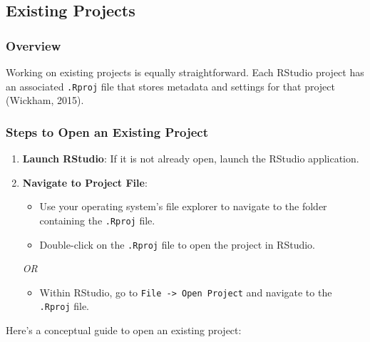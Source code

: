 \documentclass[
]{book}
\providecommand{\tightlist}{%
  \setlength{\itemsep}{0pt}\setlength{\parskip}{0pt}}
\begin{document}
\hypertarget{existing-projects}{%
\subsection*{Existing Projects}\label{existing-projects}}

\hypertarget{overview-9}{%
\subsubsection*{Overview}\label{overview-9}}

Working on existing projects is equally straightforward. Each RStudio project has an associated \texttt{.Rproj} file that stores metadata and settings for that project (Wickham, 2015).

\hypertarget{steps-to-open-an-existing-project}{%
\subsubsection*{Steps to Open an Existing Project}\label{steps-to-open-an-existing-project}}

\begin{enumerate}
\def\labelenumi{\arabic{enumi}.}
\item
  \textbf{Launch RStudio}: If it is not already open, launch the RStudio application.
\item
  \textbf{Navigate to Project File}:

  \begin{itemize}
  \tightlist
  \item
    Use your operating system's file explorer to navigate to the folder containing the \texttt{.Rproj} file.
  \item
    Double-click on the \texttt{.Rproj} file to open the project in RStudio.
  \end{itemize}

  \emph{OR}

  \begin{itemize}
  \tightlist
  \item
    Within RStudio, go to \texttt{File\ -\textgreater{}\ Open\ Project} and navigate to the \texttt{.Rproj} file.
  \end{itemize}
\end{enumerate}

Here's a conceptual guide to open an existing project:
\end{document}
